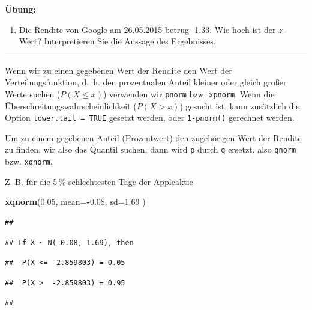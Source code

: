 \documentclass[12pt,ngerman,paper=a4,pagesize,DIV=13]{scrreprt}
\newenvironment{Shaded}{\begin{snugshade}}{\end{snugshade}}
\newcommand{\DataTypeTok}[1]{\textcolor[rgb]{0.13,0.29,0.53}{#1}}
\newcommand{\FloatTok}[1]{\textcolor[rgb]{0.00,0.00,0.81}{#1}}
\newcommand{\KeywordTok}[1]{\textcolor[rgb]{0.13,0.29,0.53}{\textbf{#1}}}
\newcommand{\NormalTok}[1]{#1}
\newcommand{\OperatorTok}[1]{\textcolor[rgb]{0.81,0.36,0.00}{\textbf{#1}}}
\providecommand{\tightlist}{%
  \setlength{\itemsep}{0pt}\setlength{\parskip}{0pt}}
\begin{document}
\textbf{Übung:}

\begin{enumerate}
\def\labelenumi{\arabic{enumi}.}
\setcounter{enumi}{4}
\tightlist
\item
  Die Rendite von Google am 26.05.2015 betrug -1.33. Wie hoch ist der
  \(z\)-Wert? Interpretieren Sie die Aussage des Ergebnisses.
\end{enumerate}

\begin{center}\rule{0.5\linewidth}{\linethickness}\end{center}

Wenn wir zu einen gegebenen Wert der Rendite den Wert der
Verteilungsfunktion, d.~h. den prozentualen Anteil kleiner oder gleich
großer Werte suchen (\(P(X \leq x)\)) verwenden wir \texttt{pnorm} bzw.
\texttt{xpnorm}. Wenn die Überschreitungswahrscheinlichkeit (\(P(X>x)\))
gesucht ist, kann zusätzlich die Option \texttt{lower.tail\ =\ TRUE}
gesetzt werden, oder \texttt{1-pnorm()} gerechnet werden.

Um zu einem gegebenen Anteil (Prozentwert) den zugehörigen Wert der
Rendite zu finden, wir also das Quantil suchen, dann wird \texttt{p}
durch \texttt{q} ersetzt, also \texttt{qnorm} bzw. \texttt{xqnorm}.

Z. B. für die 5\(\,\)\% schlechtesten Tage der Appleaktie

\begin{Shaded}
\begin{Highlighting}[]
\KeywordTok{xqnorm}\NormalTok{(}\FloatTok{0.05}\NormalTok{, }\DataTypeTok{mean=}\OperatorTok{-}\FloatTok{0.08}\NormalTok{, }\DataTypeTok{sd=}\FloatTok{1.69}\NormalTok{ )}
\end{Highlighting}
\end{Shaded}

\begin{verbatim}
## 
\end{verbatim}

\begin{verbatim}
## If X ~ N(-0.08, 1.69), then
\end{verbatim}

\begin{verbatim}
##  P(X <= -2.859803) = 0.05
\end{verbatim}

\begin{verbatim}
##  P(X >  -2.859803) = 0.95
\end{verbatim}

\begin{verbatim}
## 
\end{verbatim}
\end{document}
